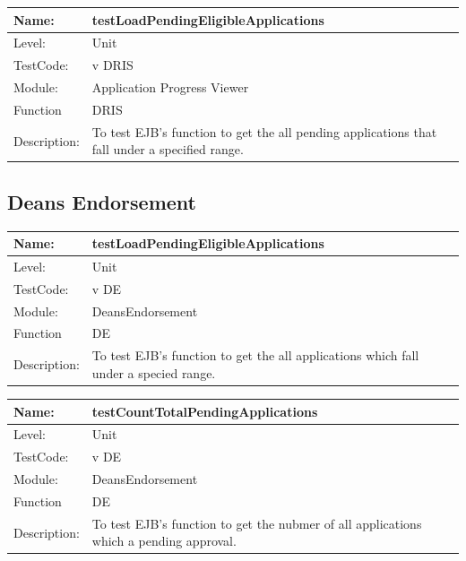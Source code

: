 \documentclass[12pt]{article}
\begin{document}
\begin{center}
\begin{tabular}{|l|p{12cm}|}
\hline

 Name: & testLoadPendingEligibleApplications  \\
\hline
Level: & Unit \\
\hline
TestCode: & v DRIS \\
\hline
Module:& Application Progress Viewer \\
\hline
Function & DRIS \\
\hline
Description: & To test EJB's function to get the all pending applications that fall under a specified range. \\
\hline
\end{tabular}
\end{center}

\subsection{Deans Endorsement}

\begin{center}
\begin{tabular}{|l|p{12cm}|}
\hline

 Name: & testLoadPendingEligibleApplications  \\
\hline
Level: & Unit \\
\hline
TestCode: & v DE \\
\hline
Module:& DeansEndorsement \\
\hline
Function & DE \\
\hline
Description: & To test EJB's function to get the all applications which fall under a specied range. \\
\hline
\end{tabular}
\end{center}

\begin{center}
\begin{tabular}{|l|p{12cm}|}
\hline

 Name: & testCountTotalPendingApplications  \\
\hline
Level: & Unit \\
\hline
TestCode: & v DE \\
\hline
Module:& DeansEndorsement \\
\hline
Function & DE \\
\hline
Description: & To test EJB's function to get the nubmer of all applications which a pending approval. \\
\hline
\end{tabular}
\end{center}
\end{document}
